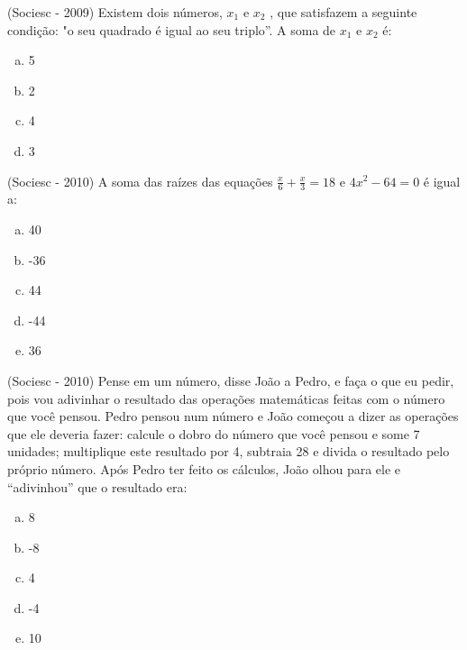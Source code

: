  \begin{exer}
 (Sociesc - 2009) Existem dois números, $x_1$ e $x_2$ , que satisfazem a seguinte condição: "o seu quadrado é igual ao seu triplo”. A soma de $x_1$ e $x_2$ é:
  \begin{enumerate}[a)]
  \item 5
  \item 2
  \item 4
  \item 3
 \end{enumerate}
 \end{exer}

 \begin{exer}
 (Sociesc - 2010) A soma das raízes das equações $\frac{x}{6}+\frac{x}{3}=18$ e $4x^2-64=0$ é igual a:
  \begin{enumerate}[a)]
  \item 40
  \item -36
  \item 44
  \item -44
  \item 36
 \end{enumerate}
 \end{exer}

 \begin{exer}
  (Sociesc - 2010) Pense em um número, disse João a Pedro, e faça o que eu pedir, pois vou adivinhar o resultado das operações matemáticas feitas com o número que você pensou. Pedro pensou num número e João começou a dizer as operações que ele deveria fazer: calcule o dobro do número que você pensou e some 7 unidades; multiplique este resultado por 4, subtraia 28 e divida o resultado pelo próprio número. Após Pedro ter feito os cálculos, João olhou para ele e “adivinhou” que o resultado era:
  \begin{enumerate}[a)]
  \item 8
  \item -8
  \item 4
  \item -4
  \item 10
 \end{enumerate}
 \end{exer}

